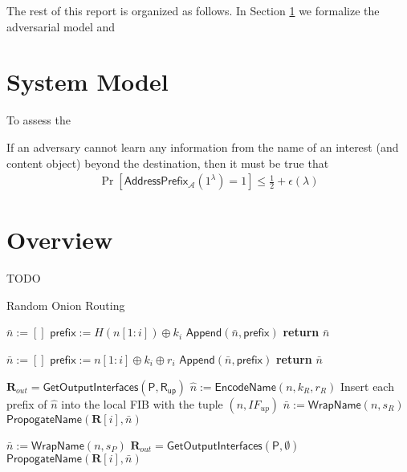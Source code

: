\documentclass{llncs}
\begin{document}
The rest of this report is organized as follows. In Section \ref{sec:model}
we formalize the adversarial model and 

\section{System Model}\label{sec:model}
To assess the 


If an adversary cannot learn any information from the name of an interest (and content object)
beyond the destination, then it must be true that
\begin{align*}
\Pr[\mathsf{AddressPrefix}_{\mathcal{A}}(1^\lambda) = 1]\leq \frac{1}{2} + \epsilon(\lambda)
\end{align*}

\section{Overview}
TODO

\begin{algorithm}[t]
  \caption{Random Onion Routing}
  \begin{algorithmic}[1]

    \State $\bar{n} := []$
    	\State $\mathsf{prefix} := H(n[1:i]) \oplus k_i$
    	\State $\mathsf{Append}(\bar{n}, \mathsf{prefix})$
    \EndFor
    \State \textbf{return} $\bar{n}$
\EndFunction

    \State $\bar{n} := []$
    	\State $\mathsf{prefix} := n[1:i] \oplus k_i \oplus r_i$
    	\State $\mathsf{Append}(\bar{n}, \mathsf{prefix})$
    \EndFor
    \State \textbf{return} $\bar{n}$
\EndFunction

	\State $\mathbf{R}_{out} = \mathsf{GetOutputInterfaces(P, R_{up})}$ %
	\State $\hat{n} := \mathsf{EncodeName}(n, k_R, r_R)$
	\State Insert each prefix of $\hat{n}$ into the local FIB with the tuple $(n, IF_{up})$
	\State $\bar{n} := \mathsf{WrapName}(n, s_R)$
      \State $\mathsf{PropogateName}(\mathbf{R}[i], \bar{n})$
    \EndFor
\EndFunction

    \State $\bar{n} := \mathsf{WrapName}(n, s_P)$
    \State $\mathbf{R}_{out} = \mathsf{GetOutputInterfaces(P, \emptyset)}$
    	\State $\mathsf{PropogateName}(\mathbf{R}[i], \bar{n})$
    \EndFor
\EndFunction

\end{algorithmic}
\end{algorithm}
\end{document}

